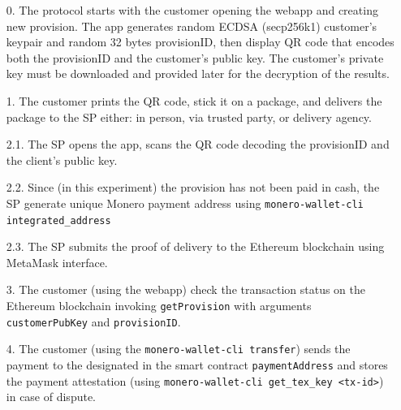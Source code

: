 \documentclass{ieeeaccess}
\begin{document}
\begin{enumerate}
  \setcounter{enumi}{0}
  \item[0.] The protocol starts with the customer opening the webapp and creating new provision. 
The app generates random ECDSA (secp256k1) customer's keypair and random 32 bytes provisionID, then display QR code that encodes both the provisionID and the customer's public key. 
The customer's private key must be downloaded and provided later for the decryption of the results.

  \item[1.] The customer prints the QR code, stick it on a package, and delivers the package to the SP either: in person, via trusted party, or delivery agency.

  \item[2.1.] The SP opens the app, scans the QR code decoding the provisionID and the client's public key.

  \item[2.2.] Since (in this experiment) the provision has not been paid in cash, the SP generate unique Monero payment address using \texttt{monero-wallet-cli integrated\_address} 
  \item[2.3.] The SP submits the proof of delivery to the Ethereum blockchain using MetaMask interface. 

  \item[3.] The customer (using the webapp) check the transaction status on the Ethereum blockchain invoking \texttt{getProvision} with arguments \texttt{customerPubKey} and \texttt{provisionID}.

  \item[4.] The customer (using the \texttt{monero-wallet-cli transfer}) sends the payment to the designated in the smart contract \texttt{paymentAddress} and stores the payment attestation (using \texttt{monero-wallet-cli get\_tex\_key <tx-id>}) in case of dispute.


\end{enumerate}
\end{document}
